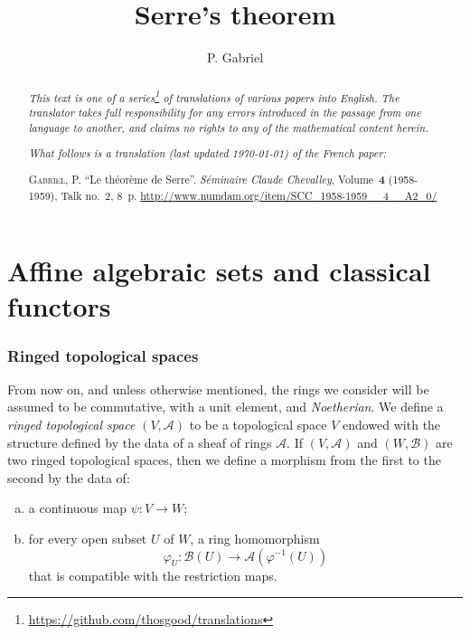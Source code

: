 \documentclass{article}
\theoremstyle{plain}
\newcommand{\sh}{\mathscr}
\newcommand{\oldpage}[1]{\marginpar{\footnotesize$\Big\vert$ \textit{p.~#1}}}
\begin{document}
\renewcommand{\abstractname}{Translator's note.}

\title{Serre's theorem}
\author{P. Gabriel}
\date{}
\maketitle

\begin{abstract}
  \renewcommand*{\thefootnote}{\fnsymbol{footnote}}
  \emph{This text is one of a series\footnote{\url{https://github.com/thosgood/translations}} of translations of various papers into English.}
  \emph{The translator takes full responsibility for any errors introduced in the passage from one language to another, and claims no rights to any of the mathematical content herein.}
  
  \emph{What follows is a translation (last updated \today) of the French paper:}

  \medskip\noindent
  \textsc{Gabriel, P.}
  ``Le th\'{e}or\`{e}me de Serre''.
  \emph{S\'{e}minaire Claude Chevalley}, Volume~\textbf{4} (1958-1959), Talk no.~2, 8~p.
  {\footnotesize\url{http://www.numdam.org/item/SCC_1958-1959__4__A2_0/}}
\end{abstract}

\setcounter{footnote}{0}

\tableofcontents
\bigskip



\part{Affine algebraic sets and classical functors}
\label{chapterA}


\section{Ringed topological spaces}
\label{section1}

\oldpage{2-01}

From now on, and unless otherwise mentioned, the rings we consider will be assumed to be commutative, with a unit element, and \emph{Noetherian}.
We define a \emph{ringed topological space} $(V,\sh{A})$ to be a topological space $V$ endowed with the structure defined by the data of a sheaf of rings $\sh{A}$.
If $(V,\sh{A})$ and $(W,\sh{B})$ are two ringed topological spaces, then we define a morphism from the first to the second by the data of:
\begin{enumerate}[(a)]
  \item a continuous map $\psi\colon V\to W$;
  \item for every open subset $U$ of $W$, a ring homomorphism
    \[
      \varphi_U\colon\sh{B}(U)\to\sh{A}(\varphi^{-1}(U))
    \]
    that is compatible with the restriction maps.
\end{enumerate}
\end{document}
